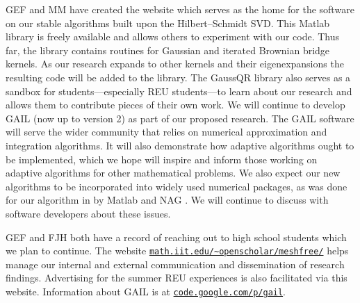 \documentclass[11pt]{NSFamsart}
\newcommand{\Matlab}{{\sc Matlab}\xspace}
\begin{document}
\begin{description}[leftmargin=0ex]
\item[Creating Software and Collaborating with Software Developers]
GEF and MM have created the website \citep{McCFBG13} which serves as the home for the software on our stable algorithms built upon the Hilbert--Schmidt SVD. This \Matlab library is freely available and allows others to experiment with our code. Thus far, the library contains routines for Gaussian and iterated Brownian bridge kernels. As our research expands to other kernels and their eigenexpansions the resulting code will be added to the library. The GaussQR library also serves as a sandbox for students---especially REU students---to learn about our research and allows them to contribute pieces of their own work.
We will continue to develop GAIL \citep{ChoEtal14a} (now up to version 2) as part of our proposed research.  The GAIL software will serve the wider community that relies on numerical approximation and integration algorithms.  It will also demonstrate how adaptive algorithms ought to be implemented, which we hope will inspire and inform those working on adaptive algorithms for other mathematical problems.  We also expect our new algorithms to be incorporated into widely used numerical packages, as was done for our algorithm in \cite{HonHic00a} by \Matlab \citep{MAT8.4} and NAG \citep{NAG23}.  We will continue to discuss with software developers about these issues.

\item[Reaching Out]
GEF and FJH both have a record of reaching out to high school students which we plan to continue. The website \href{http://math.iit.edu/~openscholar/meshfree/}{\nolinkurl{math.iit.edu/~openscholar/meshfree/}} helps manage our internal and external communication and dissemination of research findings. Advertising for the summer REU experiences is also facilitated via this website.  Information about GAIL is at \href{http://code.google.com/p/gail}{\nolinkurl{code.google.com/p/gail}}.
\end{description}

\newpage
\clearpage
{}



\renewcommand{\refname}{\hfill \textbf{\large References Cited} \hfill \hfill}                   %
\renewcommand{\bibliofont}{\normalsize}


\end{document}
